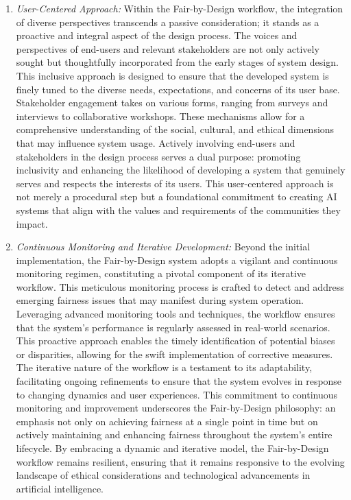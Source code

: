 \begin{enumerate}
    \item \emph{User-Centered Approach:} Within the Fair-by-Design workflow, the integration of diverse perspectives transcends a passive consideration; it stands as a proactive and integral aspect of the design process. The voices and perspectives of end-users and relevant stakeholders are not only actively sought but thoughtfully incorporated from the early stages of system design. This inclusive approach is designed to ensure that the developed system is finely tuned to the diverse needs, expectations, and concerns of its user base. Stakeholder engagement takes on various forms, ranging from surveys and interviews to collaborative workshops. These mechanisms allow for a comprehensive understanding of the social, cultural, and ethical dimensions that may influence system usage. Actively involving end-users and stakeholders in the design process serves a dual purpose: promoting inclusivity and enhancing the likelihood of developing a system that genuinely serves and respects the interests of its users. This user-centered approach is not merely a procedural step but a foundational commitment to creating AI systems that align with the values and requirements of the communities they impact.

    \item \emph{Continuous Monitoring and Iterative Development:} Beyond the initial implementation, the Fair-by-Design system adopts a vigilant and continuous monitoring regimen, constituting a pivotal component of its iterative workflow. This meticulous monitoring process is crafted to detect and address emerging fairness issues that may manifest during system operation. Leveraging advanced monitoring tools and techniques, the workflow ensures that the system's performance is regularly assessed in real-world scenarios. This proactive approach enables the timely identification of potential biases or disparities, allowing for the swift implementation of corrective measures. The iterative nature of the workflow is a testament to its adaptability, facilitating ongoing refinements to ensure that the system evolves in response to changing dynamics and user experiences. This commitment to continuous monitoring and improvement underscores the Fair-by-Design philosophy: an emphasis not only on achieving fairness at a single point in time but on actively maintaining and enhancing fairness throughout the system's entire lifecycle. By embracing a dynamic and iterative model, the Fair-by-Design workflow remains resilient, ensuring that it remains responsive to the evolving landscape of ethical considerations and technological advancements in artificial intelligence.

\end{enumerate}

